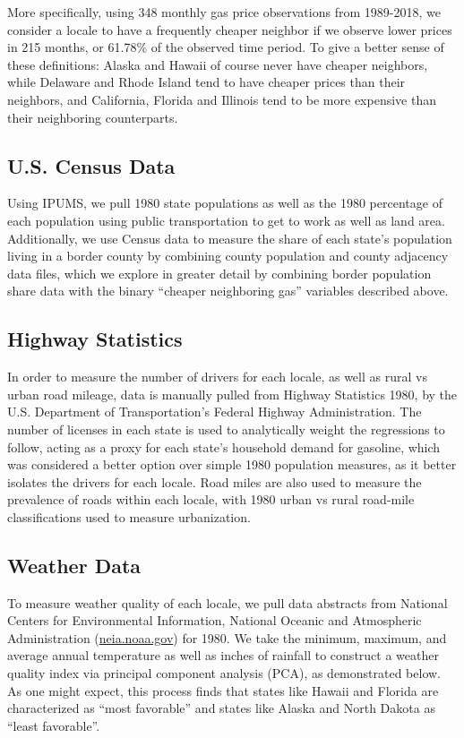 More specifically, using 348 monthly gas price observations from 1989-2018, we consider a locale to have a frequently cheaper neighbor if we observe lower prices in 215 months, or 61.78\% of the observed time period. To give a better sense of these definitions: Alaska and Hawaii of course never have cheaper neighbors, while Delaware and Rhode Island tend to have cheaper prices than their neighbors, and California, Florida and Illinois tend to be more expensive than their neighboring counterparts. \\

\subsection{U.S. Census Data}
Using IPUMS, we pull 1980 state populations as well as the 1980 percentage of each population using public transportation to get to work as well as land area. Additionally, we use Census data to measure the share of each state's population living in a border county by combining county population and county adjacency data files, which we explore in greater detail by combining border population share data with the binary ``cheaper neighboring gas'' variables described above. \\

\subsection{Highway Statistics}
In order to measure the number of drivers for each locale, as well as rural vs urban road mileage, data is manually pulled from Highway Statistics 1980, by the U.S. Department of Transportation's Federal Highway Administration. The number of licenses in each state is used to analytically weight the regressions to follow, acting as a proxy for each state's household demand for gasoline, which was considered a better option over simple 1980 population measures, as it better isolates the drivers for each locale. Road miles are also used to measure the prevalence of roads within each locale, with 1980 urban vs rural road-mile classifications used to measure urbanization. \\

\subsection{Weather Data}
To measure weather quality of each locale, we pull data abstracts from National Centers for Environmental Information, National Oceanic and Atmospheric Administration (\url{neia.noaa.gov}) for 1980. We take the minimum, maximum, and average annual temperature as well as inches of rainfall to construct a weather quality index via principal component analysis (PCA), as demonstrated below. As one might expect, this process finds that states like Hawaii and Florida are characterized as ``most favorable'' and states like Alaska and North Dakota as ``least favorable''. \\

